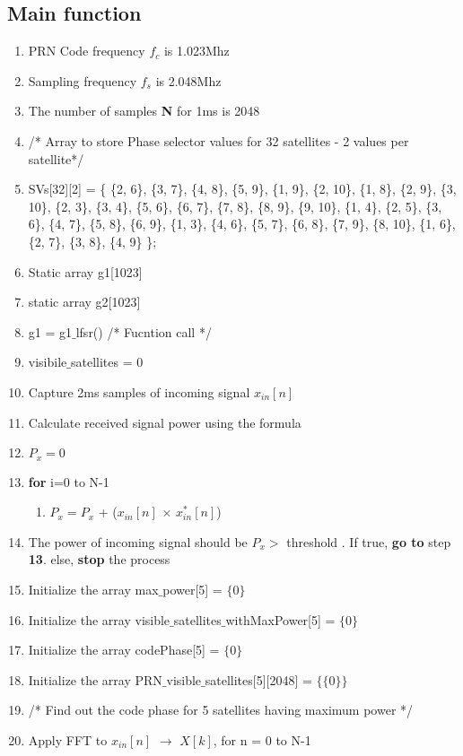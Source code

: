 \documentclass[journal,10pt,onecolumn]{article}
\begin{document}
\subsection{Main function}
\begin{enumerate}

\item[] PRN Code frequency $f_c$ is 1.023Mhz
\item[] Sampling frequency $f_s$ is 2.048Mhz
\item[] The number of samples \textbf{N} for 1ms is 2048 
\item[]  /* Array to store Phase selector values for 32 satellites - 2 values per satellite*/
\item[]  SVs[32][2] = \{
        \{2, 6\},
        \{3, 7\},
        \{4, 8\},
        \{5, 9\},
        \{1, 9\},
        \{2, 10\},
        \{1, 8\},
        \{2, 9\},
        \{3, 10\},
        \{2, 3\},
        \{3, 4\},
        \{5, 6\},
        \{6, 7\},
        \{7, 8\},
        \{8, 9\},
        \{9, 10\},
        \{1, 4\},
        \{2, 5\},
        \{3, 6\},
        \{4, 7\},
        \{5, 8\}, 
        \{6, 9\},
        \{1, 3\},
        \{4, 6\},
        \{5, 7\}, 
        \{6, 8\},
        \{7, 9\},
        \{8, 10\},
        \{1, 6\},
        \{2, 7\},
        \{3, 8\},
        \{4, 9\}
    \};
        
    \item[] Static array g1[1023]
    \item[] static array g2[1023]
    \item[] g1 =  g1$\_$lfsr()  /* Fucntion call */
    \item[] visibile$\_$satellites = 0
    \item[] Capture 2ms samples of incoming signal $x_{in}[n]$
    \item[] Calculate received signal power using the formula
    \item[] $P_x=0$
    \item[] \textbf{for} i=0 to N-1
    \begin{enumerate}
        \item[] $P_x= P_x$ + ($x_{in}[n]$ $\times$ $x^*_{in}[n]$)
    \end{enumerate} 
    \item[] The power of incoming signal should be $P_x$$>$ threshold . If true, \textbf{go to} step \textbf{13}. else, \textbf{stop} the process
    \item[] Initialize the array max$\_$power[5] = $\{0\}$
    \item[] Initialize the array visible$\_$satellites$\_$withMaxPower[5] = $\{0\}$
    \item[] Initialize the array codePhase[5] = $\{0\}$
    \item[] Initialize the array PRN$\_$visible$\_$satellites[5][2048] = $\{\{0\}\}$
    \item[] /* Find out the code phase for 5 satellites having maximum power */
    \item[] Apply FFT to $x_{in}[n]$ $\longrightarrow$ $X[k]$, for n = 0 to N-1
    

\end{enumerate}
\end{document}

